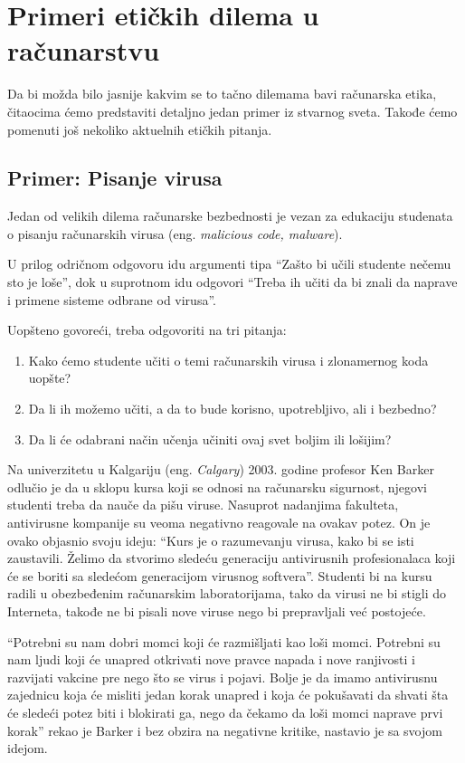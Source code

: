 \documentclass[a4paper]{article}
\begin{document}
\section{Primeri etičkih dilema u računarstvu}

Da bi možda bilo jasnije kakvim se to tačno dilemama bavi računarska etika, čitaocima ćemo predstaviti detaljno jedan primer iz stvarnog sveta. Takođe ćemo pomenuti još nekoliko aktuelnih etičkih pitanja.

\subsection{Primer: Pisanje virusa}
Jedan od velikih dilema računarske bezbednosti je vezan za edukaciju studenata o pisanju računarskih virusa (eng. \textit{malicious code, malware}).

U prilog odričnom odgovoru idu argumenti tipa ``Zašto bi učili studente nečemu sto je loše'', dok u suprotnom idu odgovori ``Treba ih učiti da bi znali da
naprave i primene sisteme odbrane od virusa''.

Uopšteno govoreći, treba odgovoriti na tri pitanja:
\begin{enumerate}
	\item Kako ćemo studente učiti o temi računarskih virusa i zlonamernog koda uopšte?
	\item Da li ih možemo učiti, a da to bude korisno, upotrebljivo, ali i bezbedno?
	\item Da li će odabrani način učenja učiniti ovaj svet boljim ili lošijim?
\end{enumerate}

Na univerzitetu u Kalgariju (eng. \textit{Calgary}) 2003. godine profesor Ken Barker odlučio je da u sklopu kursa koji se odnosi na računarsku sigurnost, njegovi
studenti treba da nauče da pišu viruse. Nasuprot nadanjima fakulteta, antivirusne kompanije su veoma negativno reagovale na ovakav potez.
On je ovako objasnio svoju ideju: ``Kurs je o razumevanju virusa, kako bi se isti zaustavili.
Želimo da stvorimo sledeću generaciju antivirusnih profesionalaca koji će se boriti sa sledećom generacijom virusnog softvera''.
Studenti bi na kursu radili u obezbeđenim računarskim laboratorijama, tako da virusi ne bi stigli do Interneta, takođe ne bi pisali nove viruse nego 
bi prepravljali već postojeće.

``Potrebni su nam dobri momci koji će razmišljati kao loši momci. Potrebni su nam ljudi koji će unapred otkrivati nove pravce napada i nove ranjivosti i razvijati vakcine pre nego što se virus i pojavi.
Bolje je da imamo antivirusnu zajednicu koja će misliti jedan korak unapred i koja će pokušavati da shvati šta će sledeći potez biti i blokirati ga, nego da čekamo da loši momci naprave prvi korak''
rekao je Barker i bez obzira na negativne kritike, nastavio je sa svojom idejom.
\end{document}
